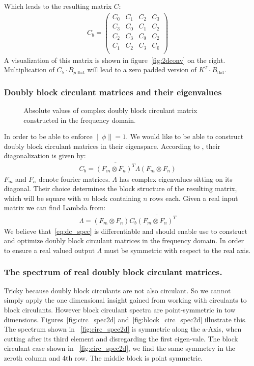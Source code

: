 \documentclass{article}
\begin{document}
Which leads to the resulting matrix $C$:
\begin{align}
C_b = \begin{pmatrix} C_0 & C_1 & C_2 & C_3 \\
                    C_3 & C_0 & C_1 & C_2 \\
                    C_2 & C_3 & C_0 & C_2 \\
                    C_1 & C_2 & C_3 & C_0 \\
    \end{pmatrix}
\end{align}
A visualization of this matrix is shown in figure~\ref{fig:2dconv} on the right. Multiplication of $C_b \cdot B_{p\text{ flat}}$ will lead to a zero padded version of $K^T \cdot B_{\text{flat}}$.


\subsubsection{Doubly block circulant matrices and their eigenvalues}
\begin{figure}
\centering

\caption{Absolute values of complex doubly block circulant matrix constructed in the frequency domain.}
\end{figure}

In order to be able to enforce $\| \phi \| = 1$. We would like to be able to construct doubly block circulant matrices in their eigenspace. According to \cite[page 185]{Davis}, their diagonalization is given by:
\begin{align} 
C_b = \overline{(F_m \otimes F_n)^T} \Lambda (F_m \otimes F_n)
\label{eq:dc_spec}
\end{align}
$F_m$ and $F_n$ denote fourier matrices. $\Lambda$ has complex eigenvalues sitting on its diagonal. Their choice determines the block structure of the resulting 
matrix, which will be square with $m$ block containing $n$ rows each.
Given a real input matrix we can find Lambda from:
\begin{align}
\Lambda = (F_m \otimes F_n) C_b \overline{(F_m \otimes F_n)^T}
\end{align}
We believe that~\ref{eq:dc_spec} is differentiable and should enable use to construct and optimize doubly block circulant matrices in the frequency domain. In order to ensure a real valued output $\Lambda$ must be symmetric with respect to the real axis.

\subsubsection{The spectrum of real doubly block circulant matrices.}
Tricky because doubly block circulants are not also circulant. So we cannot simply apply the one dimensional insight gained from working with circulants to block circulants. However block circulant spectra are point-symmetric in tow dimensions. Figures~\ref{fig:circ_spec2d} and~\ref{fig:block_circ_spec2d} illustrate this. The spectrum shown in ~\ref{fig:circ_spec2d} is symmetric along the a-Axis, when cutting after its third element and disregarding the first eigen-vale. The block circulant case shown in ~\ref{fig:circ_spec2d}, we find the same symmetry in the zeroth column and 4th row. The middle block is point symmetric. 
\end{document}
